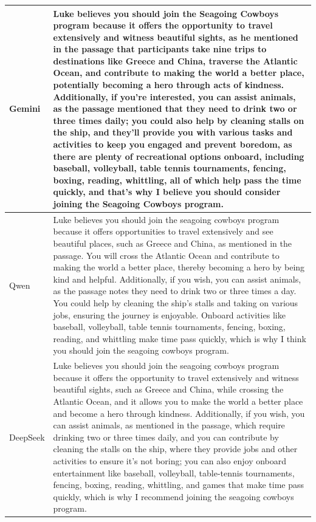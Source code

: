 \begin{table}[htbp]
\begin{tabular}{lp{12cm}}
Gemini                          & Luke believes you should join   the Seagoing Cowboys program because it offers the opportunity to travel   extensively and witness beautiful sights, as he mentioned in the passage that   participants take nine trips to destinations like Greece and China, traverse   the Atlantic Ocean, and contribute to making the world a better place,   potentially becoming a hero through acts of kindness. Additionally, if you're interested, you can assist animals, as the passage   mentioned that they need to drink two or three times daily; you could also   help by cleaning stalls on the ship, and they'll provide you with various   tasks and activities to keep you engaged and prevent boredom, as there are   plenty of recreational options onboard, including baseball, volleyball, table   tennis tournaments, fencing, boxing, reading, whittling, all of which help   pass the time quickly, and that's why I believe you should consider joining   the Seagoing Cowboys program. \\ \midrule
Qwen                            & Luke believes you should join   the seagoing cowboys program because it offers opportunities to travel   extensively and see beautiful places, such as Greece and China, as mentioned   in the passage. You will cross the Atlantic Ocean and contribute to making the   world a better place, thereby becoming a hero by being kind and   helpful. Additionally, if you wish, you can assist animals, as the passage notes   they need to drink two or three times a day. You could help by cleaning the   ship's stalls and taking on various jobs, ensuring the journey is enjoyable.   Onboard activities like baseball, volleyball, table tennis tournaments,   fencing, boxing, reading, and whittling make time pass quickly, which is why   I think you should join the seagoing cowboys program. \\ \midrule
DeepSeek                        & Luke believes you should join   the seagoing cowboys program because it offers the opportunity to travel   extensively and witness beautiful sights, such as Greece and China, while   crossing the Atlantic Ocean, and it allows you to make the world a better place   and become a hero through kindness. Additionally, if you wish, you can assist animals, as mentioned in the   passage, which require drinking two or three times daily, and you can   contribute by cleaning the stalls on the ship, where they provide jobs and   other activities to ensure it's not boring; you can also enjoy onboard   entertainment like baseball, volleyball, table-tennis tournaments, fencing,   boxing, reading, whittling, and games that make time pass quickly, which is   why I recommend joining the seagoing cowboys program. \\ \bottomrule
\end{tabular}
\end{table}

